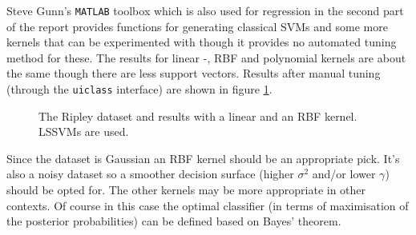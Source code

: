 \par Steve Gunn's \texttt{MATLAB} toolbox which is also used for regression in the second part of the report provides functions for generating classical SVMs and some more kernels that can be experimented with though it provides no automated tuning method for these. The results for linear -, RBF and polynomial kernels are about the same though there are less support vectors. Results after manual tuning (through the \texttt{uiclass} interface) are shown in figure \ref{ripleysvm}.

\begin{figure}[htp]
\centering
{}\hfil
{}\hfil
{}\hfil
\caption{The Ripley dataset and results with a linear and an RBF kernel. LSSVMs are used.}
\label{ripleysvm}
\end{figure}

Since the dataset is Gaussian an RBF kernel should be an appropriate pick. It's also a noisy dataset so a smoother decision surface (higher $\sigma^2$ and/or lower $\gamma$) should be opted for. The other kernels may be more appropriate in other contexts. Of course in this case the optimal classifier (in terms of maximisation of the posterior probabilities) can be defined based on Bayes' theorem.

